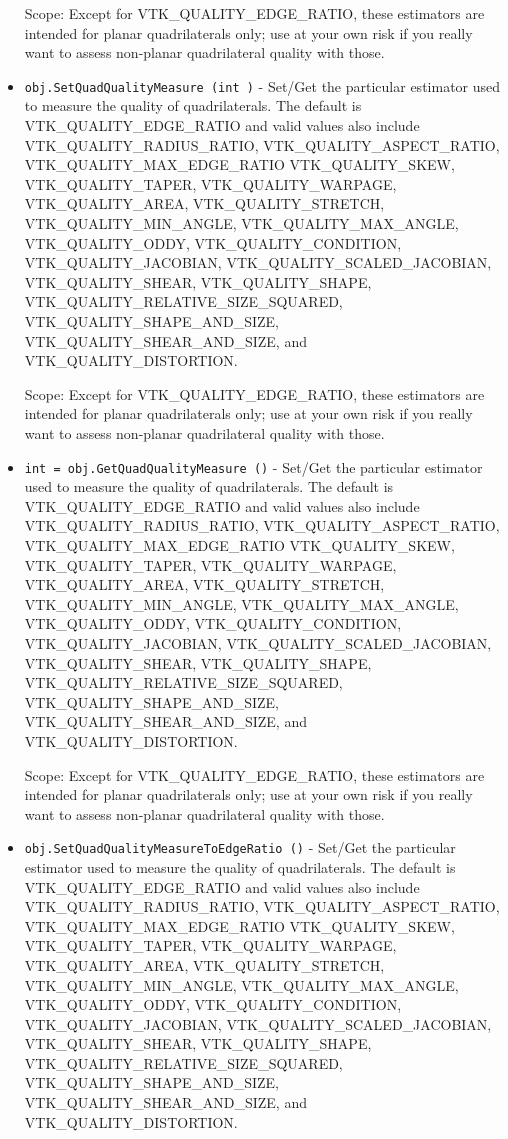 \begin{itemize}
 Scope: Except for VTK\_QUALITY\_EDGE\_RATIO, these estimators are intended for planar
 quadrilaterals only; use at your own risk if you really want to assess non-planar
 quadrilateral quality with those.

\item  \verb|obj.SetQuadQualityMeasure (int )| -  Set/Get the particular estimator used to measure the quality of quadrilaterals.
 The default is VTK\_QUALITY\_EDGE\_RATIO and valid values also include
 VTK\_QUALITY\_RADIUS\_RATIO, VTK\_QUALITY\_ASPECT\_RATIO, VTK\_QUALITY\_MAX\_EDGE\_RATIO
 VTK\_QUALITY\_SKEW, VTK\_QUALITY\_TAPER, VTK\_QUALITY\_WARPAGE, VTK\_QUALITY\_AREA,
 VTK\_QUALITY\_STRETCH, VTK\_QUALITY\_MIN\_ANGLE, VTK\_QUALITY\_MAX\_ANGLE,
 VTK\_QUALITY\_ODDY, VTK\_QUALITY\_CONDITION, VTK\_QUALITY\_JACOBIAN,
 VTK\_QUALITY\_SCALED\_JACOBIAN, VTK\_QUALITY\_SHEAR, VTK\_QUALITY\_SHAPE,
 VTK\_QUALITY\_RELATIVE\_SIZE\_SQUARED, VTK\_QUALITY\_SHAPE\_AND\_SIZE,
 VTK\_QUALITY\_SHEAR\_AND\_SIZE, and VTK\_QUALITY\_DISTORTION.

 Scope: Except for VTK\_QUALITY\_EDGE\_RATIO, these estimators are intended for planar
 quadrilaterals only; use at your own risk if you really want to assess non-planar
 quadrilateral quality with those.

\item  \verb|int = obj.GetQuadQualityMeasure ()| -  Set/Get the particular estimator used to measure the quality of quadrilaterals.
 The default is VTK\_QUALITY\_EDGE\_RATIO and valid values also include
 VTK\_QUALITY\_RADIUS\_RATIO, VTK\_QUALITY\_ASPECT\_RATIO, VTK\_QUALITY\_MAX\_EDGE\_RATIO
 VTK\_QUALITY\_SKEW, VTK\_QUALITY\_TAPER, VTK\_QUALITY\_WARPAGE, VTK\_QUALITY\_AREA,
 VTK\_QUALITY\_STRETCH, VTK\_QUALITY\_MIN\_ANGLE, VTK\_QUALITY\_MAX\_ANGLE,
 VTK\_QUALITY\_ODDY, VTK\_QUALITY\_CONDITION, VTK\_QUALITY\_JACOBIAN,
 VTK\_QUALITY\_SCALED\_JACOBIAN, VTK\_QUALITY\_SHEAR, VTK\_QUALITY\_SHAPE,
 VTK\_QUALITY\_RELATIVE\_SIZE\_SQUARED, VTK\_QUALITY\_SHAPE\_AND\_SIZE,
 VTK\_QUALITY\_SHEAR\_AND\_SIZE, and VTK\_QUALITY\_DISTORTION.

 Scope: Except for VTK\_QUALITY\_EDGE\_RATIO, these estimators are intended for planar
 quadrilaterals only; use at your own risk if you really want to assess non-planar
 quadrilateral quality with those.

\item  \verb|obj.SetQuadQualityMeasureToEdgeRatio ()| -  Set/Get the particular estimator used to measure the quality of quadrilaterals.
 The default is VTK\_QUALITY\_EDGE\_RATIO and valid values also include
 VTK\_QUALITY\_RADIUS\_RATIO, VTK\_QUALITY\_ASPECT\_RATIO, VTK\_QUALITY\_MAX\_EDGE\_RATIO
 VTK\_QUALITY\_SKEW, VTK\_QUALITY\_TAPER, VTK\_QUALITY\_WARPAGE, VTK\_QUALITY\_AREA,
 VTK\_QUALITY\_STRETCH, VTK\_QUALITY\_MIN\_ANGLE, VTK\_QUALITY\_MAX\_ANGLE,
 VTK\_QUALITY\_ODDY, VTK\_QUALITY\_CONDITION, VTK\_QUALITY\_JACOBIAN,
 VTK\_QUALITY\_SCALED\_JACOBIAN, VTK\_QUALITY\_SHEAR, VTK\_QUALITY\_SHAPE,
 VTK\_QUALITY\_RELATIVE\_SIZE\_SQUARED, VTK\_QUALITY\_SHAPE\_AND\_SIZE,
 VTK\_QUALITY\_SHEAR\_AND\_SIZE, and VTK\_QUALITY\_DISTORTION.


\end{itemize}
